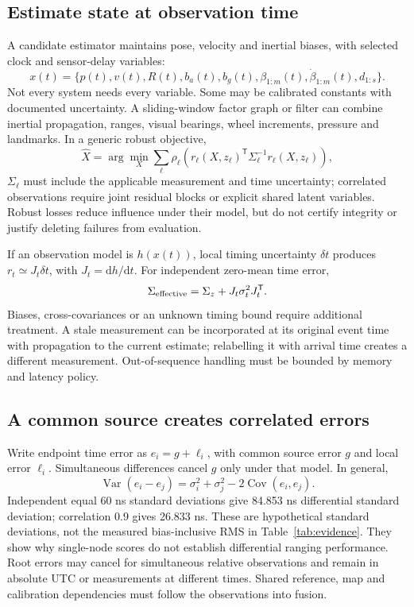 \documentclass[11pt,letterpaper]{article}
\begin{document}
\subsection{Estimate state at observation time}
A candidate estimator maintains pose, velocity and inertial biases, with selected clock and sensor-delay variables:
\begin{equation}
 x(t)=\{p(t),v(t),R(t),b_a(t),b_g(t),\beta_{1:m}(t),\dot\beta_{1:m}(t),d_{1:s}\}.
\end{equation}
Not every system needs every variable. Some may be calibrated constants with documented uncertainty. A sliding-window factor graph or filter can combine inertial propagation, ranges, visual bearings, wheel increments, pressure and landmarks. In a generic robust objective,
\begin{equation}
 \hat X=\arg\min_X\sum_{\ell}\rho_\ell\!\left(
    r_\ell(X,z_\ell)^{\mathsf T}\Sigma_\ell^{-1}r_\ell(X,z_\ell)\right),\label{eq:fusion}
\end{equation}
$\Sigma_\ell$ must include the applicable measurement and time uncertainty; correlated observations require joint residual blocks or explicit shared latent variables. Robust losses reduce influence under their model, but do not certify integrity or justify deleting failures from evaluation.

If an observation model is $h(x(t))$, local timing uncertainty $\delta t$ produces $r_t\simeq J_t\delta t$, with $J_t=\mathrm{d}h/\mathrm{d}t$. For independent zero-mean time error,
\begin{equation}
 \Sigma_{\rm effective}=\Sigma_z+J_t\sigma_t^2J_t^{\mathsf T}.\label{eq:cov}
\end{equation}
Biases, cross-covariances or an unknown timing bound require additional treatment. A stale measurement can be incorporated at its original event time with propagation to the current estimate; relabelling it with arrival time creates a different measurement. Out-of-sequence handling must be bounded by memory and latency policy.

\subsection{A common source creates correlated errors}
Write endpoint time error as $e_i=g+\ell_i$, with common source error $g$ and local error $\ell_i$. Simultaneous differences cancel $g$ only under that model. In general,
\begin{equation}
 \operatorname{Var}(e_i-e_j)=\sigma_i^2+\sigma_j^2-2\operatorname{Cov}(e_i,e_j).\label{eq:correlation}
\end{equation}
Independent equal 60 ns standard deviations give 84.853 ns differential standard deviation; correlation 0.9 gives 26.833 ns. These are hypothetical standard deviations, not the measured bias-inclusive RMS in Table~\ref{tab:evidence}. They show why single-node scores do not establish differential ranging performance. Root errors may cancel for simultaneous relative observations and remain in absolute UTC or measurements at different times. Shared reference, map and calibration dependencies must follow the observations into fusion.
\end{document}
